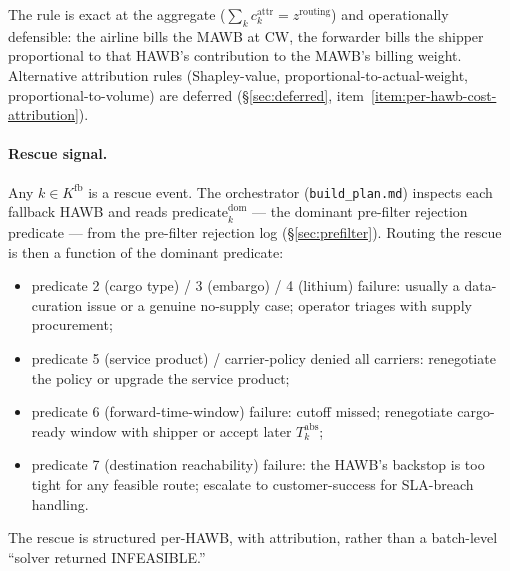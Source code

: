 \documentclass[11pt,a4paper]{article}
\theoremstyle{definition}
\begin{document}
The rule is exact at the aggregate ($\sum_k c_k^{\text{attr}} =
z^{\text{routing}}$) and operationally defensible: the airline bills the
MAWB at $\text{CW}$, the forwarder bills the shipper proportional to that
HAWB's contribution to the MAWB's billing weight. Alternative attribution
rules (Shapley-value, proportional-to-actual-weight,
proportional-to-volume) are deferred (\S\ref{sec:deferred},
item~\ref{item:per-hawb-cost-attribution}).

\paragraph{Rescue signal.}
Any $k \in K^{\text{fb}}$ is a rescue event. The orchestrator
(\texttt{build\_plan.md}) inspects each fallback HAWB and reads
$\text{predicate}^{\text{dom}}_k$ --- the dominant pre-filter
rejection predicate --- from the pre-filter rejection log
(\S\ref{sec:prefilter}). Routing the rescue is then a function of the
dominant predicate:
\begin{itemize}[noitemsep]
  \item predicate 2 (cargo type) / 3 (embargo) / 4 (lithium) failure:
        usually a data-curation issue or a genuine no-supply case;
        operator triages with supply procurement;
  \item predicate 5 (service product) / carrier-policy denied all
        carriers: renegotiate the policy or upgrade the service
        product;
  \item predicate 6 (forward-time-window) failure: cutoff missed;
        renegotiate cargo-ready window with shipper or accept later
        $T_k^{\text{abs}}$;
  \item predicate 7 (destination reachability) failure: the HAWB's
        backstop is too tight for any feasible route; escalate to
        customer-success for SLA-breach handling.
\end{itemize}
The rescue is structured per-HAWB, with attribution, rather than a
batch-level ``solver returned INFEASIBLE.''
\end{document}
